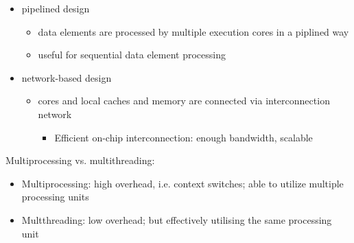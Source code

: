 \documentclass{article}
\begin{document}
\begin{itemize}
\begin{itemize}
\begin{itemize}
        \end{itemize}
        \item pipelined design
        \begin{itemize}
            \item data elements are processed by multiple execution cores in a piplined way
            \item useful for sequential data element processing
        \end{itemize}
        \item network-based design
        \begin{itemize}
            \item cores and local caches and memory are connected via interconnection network
            \begin{itemize}
                \item Efficient on-chip interconnection: enough bandwidth, scalable
            \end{itemize}
        \end{itemize}
    \end{itemize}
    Multiprocessing vs. multithreading:
    \begin{itemize}
        \item Multiprocessing: high overhead, i.e. context switches; able to utilize multiple processing units
        \item Multthreading: low overhead; but effectively utilising the same processing unit
    \end{itemize}
\end{itemize}
\end{document}
